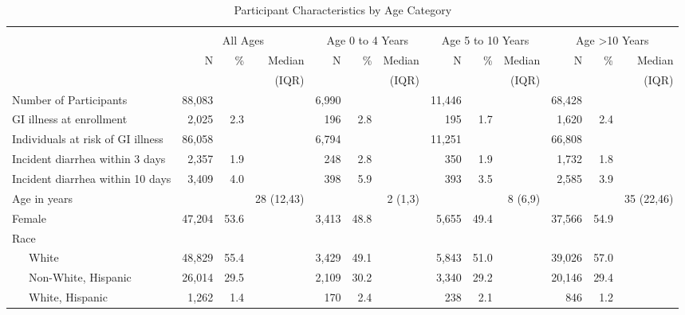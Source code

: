\documentclass[12pt]{article}\usepackage[]{graphicx}\usepackage[]{color}
\begin{document}
\begin{landscape}
\begin{table}[h!tb]
\begin{center}
\caption{Participant Characteristics by Age Category \label{tab:ptable}}
\begin{footnotesize}
\begin{tabular}{l rrr rrr rrr rrr}
 & \\
  & \multicolumn{3}{c}{All Ages} & \multicolumn{3}{c}{Age 0 to 4 Years} & \multicolumn{3}{c}{Age 5 to 10 Years} & \multicolumn{3}{c}{Age >10 Years}   \\
    & N & \% & Median &  N & \% & Median & N & \% & Median  & N & \% & Median \\
  &  &  & (IQR) &  &  &  (IQR) &  &  &  (IQR) &  &  &  (IQR) \\
\hline
 Number of Participants & 88,083 &  &  & 6,990 &  &  & 11,446 &  &  & 68,428 &  &  \\ 
  GI illness at enrollment &  2,025 & 2.3 &  &   196 & 2.8 &  &    195 & 1.7 &  &  1,620 & 2.4 &  \\ 
  Individuals at risk of GI illness & 86,058 &  &  & 6,794 &  &  & 11,251 &  &  & 66,808 &  &  \\ 
  Incident diarrhea within 3 days &  2,357 & 1.9 &  &   248 & 2.8 &  &    350 & 1.9 &  &  1,732 & 1.8 &  \\ 
  Incident diarrhea within 10 days &  3,409 & 4.0 &  &   398 & 5.9 &  &    393 & 3.5 &  &  2,585 & 3.9 &  \\ 
  Age in years &  &  & 28 (12,43) &  &  & 2 (1,3) &  &  & 8 (6,9) &  &  & 35 (22,46) \\ 
  Female & 47,204 & 53.6 &  & 3,413 & 48.8 &  &  5,655 & 49.4 &  & 37,566 & 54.9 &  \\ 
  Race &  &  &  &  &  &  &  &  &  &  &  &  \\ 
  ~~~White & 48,829 & 55.4 &  & 3,429 & 49.1 &  &  5,843 & 51.0 &  & 39,026 & 57.0 &  \\ 
  ~~~Non-White, Hispanic & 26,014 & 29.5 &  & 2,109 & 30.2 &  &  3,340 & 29.2 &  & 20,146 & 29.4 &  \\ 
  ~~~White, Hispanic &  1,262 & 1.4 &  &   170 & 2.4 &  &    238 & 2.1 &  &    846 & 1.2 &  \\ 

\end{tabular}
\end{footnotesize}
\end{center}
\end{table}
\end{landscape}
\end{document}
